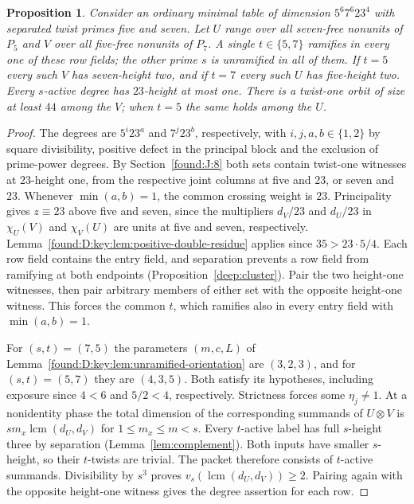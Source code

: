\documentclass[11pt,a4paper]{article}
\numberwithin{equation}{section}
\newtheorem{proposition}[theorem]{Proposition}
\theoremstyle{remark}
\begin{document}
\begin{proposition}\label{found:D:6.3}\label{found:D:key:prop:odd-oriented-path}
Consider an ordinary minimal table of dimension $5^6 7^6 23^4$ with separated twist primes five and seven. Let $U$ range over all seven-free nonunits of $P_5$ and $V$ over all five-free nonunits of $P_7$. A single $t\in\{5,7\}$ ramifies in every one of these row fields; the other prime $s$ is unramified in all of them. If $t=5$ every such $V$ has seven-height two, and if $t=7$ every such $U$ has five-height two. Every $s$-active degree has $23$-height at most one. There is a twist-one orbit of size at least $44$ among the $V$; when $t=5$ the same holds among the $U$.
\end{proposition}
\begin{proof}
The degrees are $5^i23^a$ and $7^j23^b$, respectively, with $i,j,a,b\in\{1,2\}$ by square divisibility, positive defect in the principal block and the exclusion of prime-power degrees. By Section~\ref{found:J:8} both sets contain twist-one witnesses at $23$-height one, from the respective joint columns at five and $23$, or seven and $23$. Whenever $\min(a,b)=1$, the common crossing weight is $23$. Principality gives $z\equiv23$ above five and seven, since the multipliers $d_V/23$ and $d_U/23$ in $\chi_U(V)$ and $\chi_V(U)$ are units at five and seven, respectively. Lemma~\ref{found:D:key:lem:positive-double-residue} applies since $35>23\cdot5/4$. Each row field contains the entry field, and separation prevents a row field from ramifying at both endpoints (Proposition~\ref{deep:cluster}). Pair the two height-one witnesses, then pair arbitrary members of either set with the opposite height-one witness. This forces the common $t$, which ramifies also in every entry field with $\min(a,b)=1$.

For $(s,t)=(7,5)$ the parameters $(m,c,L)$ of Lemma~\ref{found:D:key:lem:unramified-orientation} are $(3,2,3)$, and for $(s,t)=(5,7)$ they are $(4,3,5)$. Both satisfy its hypotheses, including exposure since $4<6$ and $5/2<4$, respectively. Strictness forces some $\eta_j\ne1$. At a nonidentity phase the total dimension of the corresponding summands of $U\otimes V$ is $s m_x\operatorname{lcm}(d_U,d_V)$ for $1\le m_x\le m<s$. Every $t$-active label has full $s$-height three by separation (Lemma~\ref{lem:complement}). Both inputs have smaller $s$-height, so their $t$-twists are trivial. The packet therefore consists of $t$-active summands. Divisibility by $s^3$ proves $v_s(\operatorname{lcm}(d_U,d_V))\ge2$. Pairing again with the opposite height-one witness gives the degree assertion for each row.


\end{proof}
\end{document}

